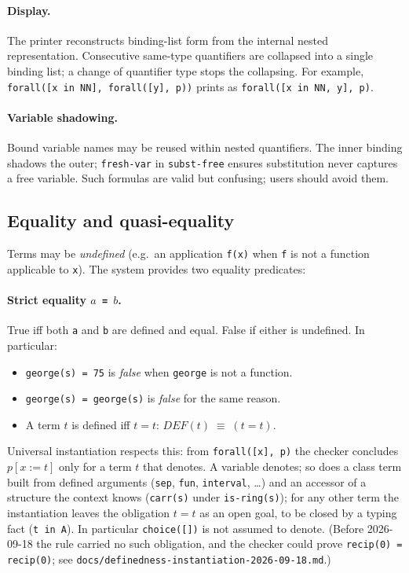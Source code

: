 \paragraph{Display.}
The printer reconstructs binding-list form from the internal nested
representation.  Consecutive same-type quantifiers are collapsed into
a single binding list; a change of quantifier type stops the collapsing.
For example, \texttt{forall([x in NN], forall([y], p))} prints as
\texttt{forall([x in NN, y], p)}.

\paragraph{Variable shadowing.}
Bound variable names may be reused within nested quantifiers.
The inner binding shadows the outer; \texttt{fresh-var} in
\texttt{subst-free} ensures substitution never captures a free variable.
Such formulas are valid but confusing; users should avoid them.

\subsection{Equality and quasi-equality}

Terms may be \emph{undefined} (e.g.\ an application \texttt{f(x)} when
\texttt{f} is not a function applicable to \texttt{x}).  The system
provides two equality predicates:

\paragraph{Strict equality \texttt{$a$ = $b$}.}
True iff both \texttt{a} and \texttt{b} are defined and equal.
False if either is undefined.  In particular:
\begin{itemize}
\item \texttt{george(s) = 75} is \emph{false} when \texttt{george}
  is not a function.
\item \texttt{george(s) = george(s)} is \emph{false} for the same
  reason.
\item A term $t$ is defined iff $t = t$:
  $\mathit{DEF}(t) \;\equiv\; (t = t)$.
\end{itemize}

\noindent
Universal instantiation respects this: from \texttt{forall([x], p)} the
checker concludes $p[x := t]$ only for a term $t$ that denotes.  A
variable denotes; so does a class term built from defined arguments
(\texttt{sep}, \texttt{fun}, \texttt{interval}, \ldots) and an
accessor of a structure the context knows (\texttt{carr(s)} under
\texttt{is-ring(s)}); for any other term the instantiation leaves the
obligation $t = t$ as an open goal, to be closed by a typing fact
(\texttt{t in A}).  In particular \texttt{choice([])} is not assumed
to denote.  (Before 2026-09-18 the rule carried no such obligation, and
the checker could prove \texttt{recip(0) = recip(0)}; see
\texttt{docs/definedness-instantiation-2026-09-18.md}.)

